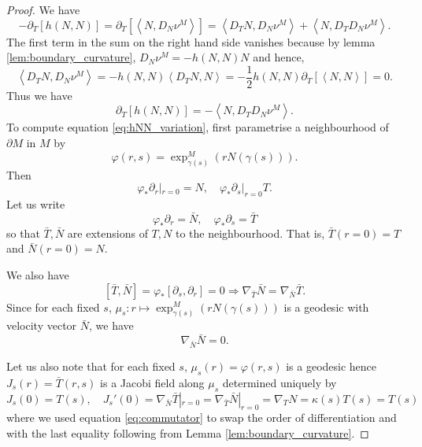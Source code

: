 \documentclass[10pt]{amsart}
\newcommand{\IP}[2]{\left< #1 , #2 \right>}
\theoremstyle{remark}
\begin{document}
\begin{proof}
We have
\[
-\partial_T [h(N, N)] = \partial_T [\IP{N}{D_{N} \nu^M}] = \IP{D_T N}{D_{N} \nu^M} + \IP{N}{D_T D_{N} \nu^M}.
\]
The first term in the sum on the right hand side vanishes because by lemma \ref{lem:boundary_curvature}, \(D_N\nu^M = -h(N, N) N\) and hence,
\[
\IP{D_T N}{D_{N} \nu^M} = -h(N, N) \IP{D_T N}{N} = -\frac{1}{2} h(N, N) \partial_T [\IP{N}{N}] = 0.
\]
Thus we have
\begin{equation}
\label{eq:hNN_variation}
\partial_T [h(N, N)] = - \IP{N}{D_T D_{N} \nu^M}.
\end{equation}
To compute equation \eqref{eq:hNN_variation}, first parametrise a neighbourhood of \(\partial M\) in \(M\) by
\[
\varphi(r, s) = \exp^M_{\gamma(s)} (r N(\gamma(s))).
\]
Then
\[
\varphi_{\ast} \partial_r |_{r=0} = N, \quad \varphi_{\ast} \partial_s |_{r=0} T.
\]
Let us write
\[
\varphi_{\ast} \partial_r = \bar{N}, \quad \varphi_{\ast} \partial_s = \bar{T}
\]
so that \(\bar{T}, \bar{N}\) are extensions of \(T, N\) to the neighbourhood. That is, \(\bar{T}(r=0) = T\) and \(\bar{N}(r=0) = N\).

We also have
\begin{equation}
\label{eq:commutator}
[\bar{T}, \bar{N}] = \varphi_{\ast} [\partial_s, \partial_r] = 0 \Rightarrow \nabla_{\bar{T}} \bar{N} = \nabla_{\bar{N}} \bar{T}.
\end{equation}
Since for each fixed \(s\), \(\mu_s : r \mapsto \exp^M_{\gamma(s)} (rN(\gamma(s)))\) is a geodesic with velocity vector \(\bar{N}\), we have
\begin{equation}
\label{eq:geodesic_variation}
\nabla_{\bar{N}} \bar{N} = 0.
\end{equation}

Let us also note that for each fixed \(s\), \(\mu_s (r) = \varphi(r, s)\) is a geodesic hence \(J_s (r) = \bar{T}(r, s)\) is a Jacobi field along \(\mu_s\) determined uniquely by
\begin{equation}
\label{eq:jacobi}
J_s(0) = T(s), \quad J_s'(0) = \nabla_{\bar{N}} \bar{T}|_{r=0} = \nabla_{\bar{T}} \bar{N}|_{r=0} = \nabla_T N = \kappa(s) T (s) = T (s)
\end{equation}
where we used equation \eqref{eq:commutator} to swap the order of differentiation and with the last equality following from Lemma \ref{lem:boundary_curvature}.


\end{proof}
\end{document}
